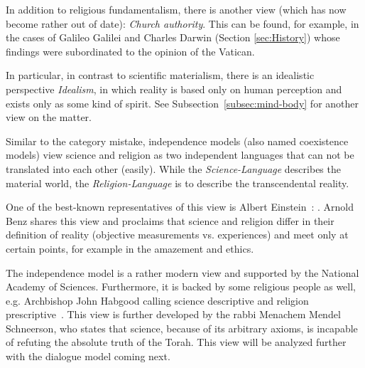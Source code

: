 In addition to religious fundamentalism, there is another view (which has now become rather out of date): \emph{Church authority}.
This can be found, for example, in the cases of Galileo Galilei and Charles Darwin (Section \ref{sec:History}) whose findings were subordinated to the opinion of the Vatican.


In particular, in contrast to scientific materialism, there is an idealistic perspective \emph{Idealism}, in which reality is based only on human perception and exists only as some kind of spirit.
See Subsection~\ref{subsec:mind-body} for another view on the matter.




\label{subsec:independence}

Similar to the category mistake, independence models (also named coexistence models) view science and religion as two independent languages that can not be translated into each other (easily).
While the \textit{Science-Language} describes the  material world, the \textit{Religion-Language} is to describe the transcendental reality.

One of the best-known representatives of this view is Albert Einstein~\cite[p.~605\,ff.]{einstein1940science}:
.
Arnold Benz shares this view and proclaims that science and religion
differ in their definition of reality (objective measurements vs. experiences) and meet only at certain points, for example in the amazement and ethics.

The independence model is a rather modern view and supported by the
National Academy of Sciences.
Furthermore, it is backed by some religious people as well, e.g. Archbishop John Habgood calling science descriptive and religion prescriptive~\cite{habgood1964religion}.
This view is further developed by the rabbi Menachem Mendel Schneerson, who states that science, because of its arbitrary axioms, is incapable of refuting the absolute truth of the Torah. This view will be analyzed further with the dialogue model coming next.

